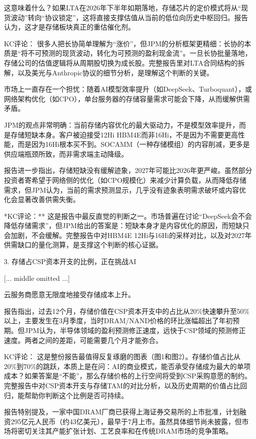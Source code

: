 \documentclass[11pt]{ctexart}
\begin{document}
这意味着什么？如果LTA在2026年下半年如期落地，存储芯片的定价模式将从“现货波动”转向“协议锁定”，这将直接支撑估值从当前的低位向历史中枢回归。报告认为，这才是存储板块真正的重估催化剂。

KC评论： 很多人把长协简单理解为“涨价”，但JPM的分析框架更精细：长协的本质是“将不可预测的现货波动，转化为可预测的盈利现金流”。一旦长协批量落地，存储公司的估值逻辑将从周期股切换为成长股。完整报告里对LTA合同结构的拆解，以及美光与Anthropic协议的细节分析，是理解这个判断的关键。

市场上一直存在一个担忧：随着AI模型效率提升（如DeepSeek、Turboquant），或网络架构优化（如CPO），单台服务器的存储容量需求可能会下降，从而缓解供需矛盾。

JPM的观点非常明确：当前存储内容优化的最大驱动力，不是模型效率提升，而是存储短缺本身。客户被迫接受12Hi HBM4E而非16Hi，不是因为不需要更高性能，而是因为16Hi根本买不到。SOCAMM（一种存储模组）的内容削减，更多是供应端瓶颈所致，而非需求端主动降级。

报告进一步指出，存储短缺没有缓解迹象，2027年可能比2026年更严峻。虽然部分投资者寄希望于网络侧的优化（如CPO规模化）来减少计算负载，从而降低存储需求，但JPM认为，当前的需求预测显示，几乎没有迹象表明需求破坏或内容优化会显著改善供需失衡。

*KC评论：** 这是报告中最反直觉的判断之一。市场普遍在讨论“DeepSeek会不会降低存储需求”，但JPM给出的答案是：短缺本身才是内容优化的原因，而短缺只会加剧，不会缓解。完整报告中对HBM4E 12Hi与16Hi的采样对比，以及对2027年供需缺口的量化测算，是支撑这个判断的核心证据。

3. 存储占CSP资本开支的比例，正在挑战AI

[... middle omitted ...]

云服务商愿意无限度地接受存储成本上升。

报告指出，过去12个月，存储价值在CSP资本开支中的占比从20\%快速攀升至50\%以上，主要发生在3月季度，当时DRAM/NAND价格的环比涨幅超出了年初预期。但JPM认为，半导体领域的盈利预测修正速度，远快于CSP领域的预测修正速度。两者之间的差距，可能需要几个月才能弥合。

KC评论： 这是整份报告最值得反复琢磨的图表（图1和图2）。存储价值占比从20\%到70\%的跳跃，本质上是在问：AI的商业模式，能否承受存储成为最大的单项成本？如果答案是“不能”，那么存储价格的上行空间将受到CSP采购意愿的制约。完整报告中对CSP资本开支与存储TAM的对比分析，以及历史周期的价值占比回归，能帮助你判断这个比例是否可持续。

报告特别提及，一家中国DRAM厂商已获得上海证券交易所的上市批准，计划融资295亿元人民币（约43亿美元），最早于7月上市。虽然具体细节尚未披露，但市场将密切关注其产能扩张计划、工艺良率和在传统DRAM市场的竞争策略。
\end{document}
